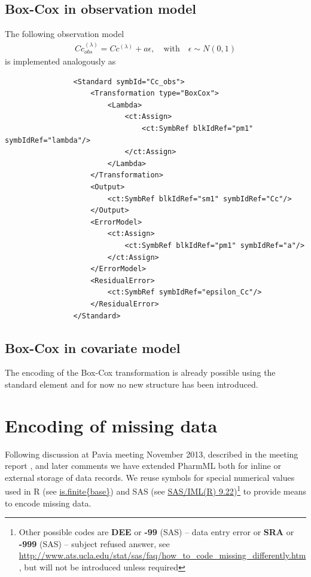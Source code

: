 \subsection{Box-Cox in observation model}
The following observation model 
\begin{align*}
        Cc_{obs}^{(\lambda)} = Cc^{(\lambda)} + a \epsilon, \quad \text{with} \quad \epsilon \sim N(0,1)
\end{align*}
is implemented analogously as 
\lstset{language=XML}
\begin{lstlisting}
                <Standard symbId="Cc_obs">
                    <Transformation type="BoxCox">
                        <Lambda>
                            <ct:Assign>
                                <ct:SymbRef blkIdRef="pm1" symbIdRef="lambda"/>
                            </ct:Assign>
                        </Lambda>
                    </Transformation>
                    <Output>
                        <ct:SymbRef blkIdRef="sm1" symbIdRef="Cc"/>
                    </Output>
                    <ErrorModel>
                        <ct:Assign>
                            <ct:SymbRef blkIdRef="pm1" symbIdRef="a"/>
                        </ct:Assign>
                    </ErrorModel>
                    <ResidualError>
                        <ct:SymbRef symbIdRef="epsilon_Cc"/>
                    </ResidualError>
                </Standard>
\end{lstlisting}


\subsection{Box-Cox in covariate model}
The encoding of the Box-Cox transformation is already possible using the
standard  element and for now no new structure has been introduced.



\section{Encoding of missing data}
\label{sec:missingData}
Following discussion at Pavia meeting November 2013, described in the meeting 
report \cite{Swat:2013pavia}, and later comments we have extended 
PharmML both for inline or external storage of data records.  We reuse symbols for special numerical values
used in R (see \href{https://stat.ethz.ch/R-manual/R-devel/library/base/html/is.finite.html}{is.finite\{base\}}) 
and SAS (see \href{http://support.sas.com/documentation/cdl/en/imlug/63541/HTML/default/viewer.htm#imlug_r_sect019.htm}{SAS/IML(R) 9.22})\footnote{Other possible codes are \textbf{DEE} or \textbf{-99} (SAS) 
-- data entry error or \textbf{SRA} or \textbf{-999} (SAS) -- subject refused answer, 
see \url{http://www.ats.ucla.edu/stat/sas/faq/how_to_code_missing_differently.htm}, 
but will not be introduced unless required} to provide means to encode missing data.

